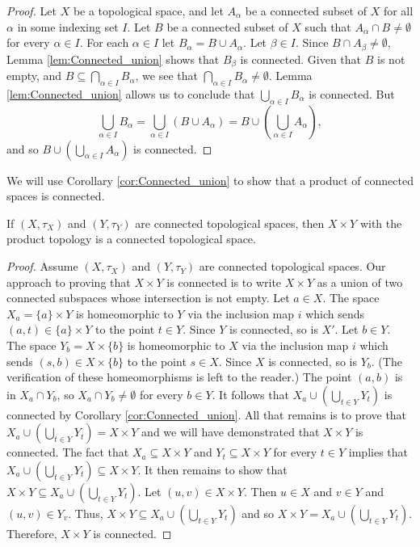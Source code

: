 \begin{proof} Let $X$ be a topological space, and let $A_{\alpha}$ be a connected subset of $X$ for all $\alpha$ in some indexing set $I$. Let $B$ be a connected subset of $X$ such that $A_{\alpha} \cap B \neq \emptyset$ for every $\alpha \in I$. For each $\alpha \in I$ let $B_{\alpha} = B \cup A_{\alpha}$. Let $\beta \in I$. Since $B \cap A_{\beta} \neq \emptyset$, Lemma \ref{lem:Connected_union} shows that $B_{\beta}$ is connected. Given that $B$ is not empty, and $B \subseteq \bigcap_{\alpha \in I} B_{\alpha}$, we see that $\bigcap_{\alpha \in I} B_{\alpha} \neq \emptyset$. Lemma \ref{lem:Connected_union} allows us to conclude that $\bigcup_{\alpha \in I} B_{\alpha}$ is connected. But 
\[\bigcup_{\alpha \in I} B_{\alpha} = \bigcup_{\alpha \in I} (B \cup A_{\alpha}) = B \cup \left(\bigcup_{\alpha \in I} A_{\alpha}\right),\]
and so $B \cup \left(\bigcup_{\alpha \in I} A_{\alpha}\right)$ is connected. 
\end{proof}

We will use Corollary \ref{cor:Connected_union} to show that a product of connected spaces is connected. 
 
\begin{theorem} If $(X, \tau_X)$ and $(Y, \tau_Y)$ are connected topological spaces, then $X \times Y$ with the product topology is a connected topological space.  
\end{theorem}

\begin{proof} Assume $(X, \tau_X)$ and $(Y, \tau_Y)$ are connected topological spaces. Our approach to proving that $X \times Y$ is connected is to write $X \times Y$ as a union of two connected subspaces whose intersection is not empty. Let $a \in X$. The space $X_a = \{a\} \times Y$ is homeomorphic to $Y$ via the inclusion map $i$ which sends $(a,t) \in \{a\} \times Y$ to the point $t \in Y$. Since $Y$ is connected, so is $X'$. Let $b \in Y$. The space $Y_b = X \times \{b\}$ is homeomorphic to $X$ via the inclusion map $i$ which sends $(s,b) \in X \times \{b\}$ to the point $s \in X$. Since $X$ is connected, so is $Y_b$. (The verification of these homeomorphisms is left to the reader.) The point $(a,b)$ is in $X_a \cap Y_b$, so $X_a \cap Y_b \neq \emptyset$ for every $b \in Y$. It follows that $X_a \cup \left( \bigcup_{t \in Y} Y_t \right)$ is connected by Corollary \ref{cor:Connected_union}. All that remains is to prove that $X_a \cup \left( \bigcup_{t \in Y} Y_t \right) = X \times Y$ and we will have demonstrated that $X \times Y$ is connected.  The fact that $X_a \subseteq X \times Y$ and $Y_t \subseteq X \times Y$ for every $t \in Y$ implies that $X_a \cup \left( \bigcup_{t \in Y} Y_t \right) \subseteq X \times Y$. It then remains to show that $X \times Y \subseteq X_a \cup \left( \bigcup_{t \in Y} Y_t \right)$. Let $(u,v) \in X \times Y$. Then $u \in X$ and $v \in Y$ and $(u,v) \in Y_v$. Thus, $X \times Y \subseteq X_a \cup \left( \bigcup_{t \in Y} Y_t \right)$ and so $X \times Y = X_a \cup \left( \bigcup_{t \in Y} Y_t \right)$. Therefore, $X \times Y$ is connected.  
\end{proof}

